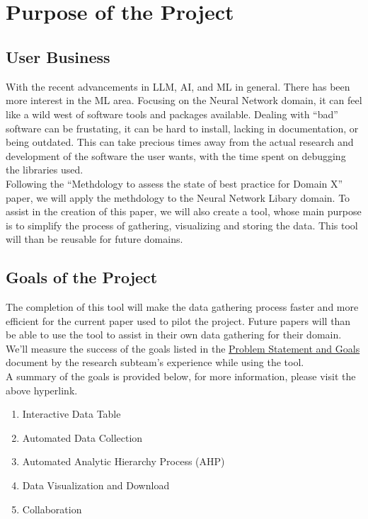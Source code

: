 \documentclass[12pt]{article}
\begin{document}
~\newpage

\tableofcontents

~\newpage
\section{Purpose of the Project}
\subsection{User Business}
With the recent advancements in LLM, AI, and ML in general. There has been more interest in the ML area. Focusing on the Neural Network domain, it can feel like a wild west of software tools and packages available. Dealing with “bad” software can be frustating, it can be hard to install, lacking in documentation, or being outdated. 
This can take precious times away from the actual research and development of the software the user wants, with the time spent on debugging the libraries used.
\\Following the “Methdology to assess the state of best practice for Domain X” paper, we will apply the methdology to the Neural Network Libary domain. 
To assist in the creation of this paper, we will also create a tool, whose main purpose is to simplify the process of gathering, visualizing and storing the data. This tool will than be reusable for future domains. 
\subsection{Goals of the Project}
The completion of this tool will make the data gathering process faster and more efficient for the current paper used to pilot the project. Future papers will than be able to use the tool to assist in their own data gathering for their domain.\\
We'll measure the success of the goals listed in the \href{https://github.com/thaafei/DomainX/blob/main/docs/ProblemStatementAndGoals/ProblemStatement.pdf}{Problem Statement and Goals} document by the research subteam's experience while using the tool. \\
A summary of the goals is provided below, for more information, please visit the above hyperlink.
\begin{enumerate}
  \item Interactive Data Table
  \item Automated Data Collection
  \item Automated Analytic Hierarchy Process (AHP)
  \item Data Visualization and Download
  \item Collaboration
\end{enumerate}
\end{document}
